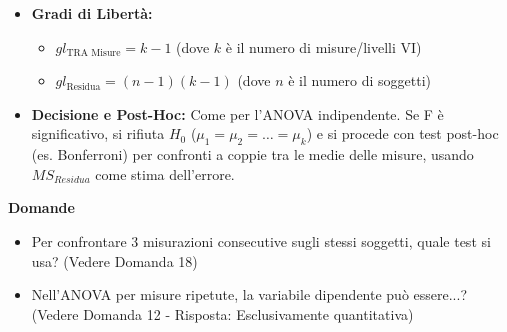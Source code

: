 \documentclass[12pt, a4paper]{article}
\newenvironment{reflectionbox}{%
    \medskip
    \begin{framed}\par\noindent
    \textbf{\color{boxtitlecolor}Domande} \par
    \begin{itemize}[leftmargin=*, label=$\blacktriangleright$]
}{%
    \end{itemize}\par
    \end{framed}
    \medskip
}
\newcommand{\Hnull}{H_0} %
\newcommand{\df}{gl} %
\begin{document}
\begin{itemize}
            \item \textbf{Gradi di Libertà:}
                \begin{itemize}
                    \item $\df_{\text{TRA Misure}} = k - 1$ (dove $k$ è il numero di misure/livelli VI)
                    \item $\df_{\text{Residua}} = (n - 1)(k - 1)$ (dove $n$ è il numero di soggetti)
                \end{itemize}
    \item \textbf{Decisione e Post-Hoc:} Come per l'ANOVA indipendente. Se F è significativo, si rifiuta $\Hnull$ ($\mu_1=\mu_2=\dots=\mu_k$) e si procede con test post-hoc (es. Bonferroni) per confronti a coppie tra le medie delle misure, usando $MS_{Residua}$ come stima dell'errore.
\end{itemize}

\begin{reflectionbox}
    \item Per confrontare 3 misurazioni consecutive sugli stessi soggetti, quale test si usa? (Vedere Domanda 18)
    \item Nell'ANOVA per misure ripetute, la variabile dipendente può essere...? (Vedere Domanda 12 - Risposta: Esclusivamente quantitativa)
\end{reflectionbox}
\end{document}
